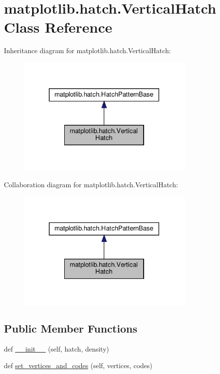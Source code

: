 \hypertarget{classmatplotlib_1_1hatch_1_1VerticalHatch}{}\section{matplotlib.\+hatch.\+Vertical\+Hatch Class Reference}
\label{classmatplotlib_1_1hatch_1_1VerticalHatch}


Inheritance diagram for matplotlib.\+hatch.\+Vertical\+Hatch\+:
\nopagebreak
\begin{figure}[H]
\begin{center}
\leavevmode
\includegraphics[width=249pt]{classmatplotlib_1_1hatch_1_1VerticalHatch__inherit__graph}
\end{center}
\end{figure}


Collaboration diagram for matplotlib.\+hatch.\+Vertical\+Hatch\+:
\nopagebreak
\begin{figure}[H]
\begin{center}
\leavevmode
\includegraphics[width=249pt]{classmatplotlib_1_1hatch_1_1VerticalHatch__coll__graph}
\end{center}
\end{figure}
\subsection*{Public Member Functions}
\begin{DoxyCompactItemize}
\item 
def \hyperlink{classmatplotlib_1_1hatch_1_1VerticalHatch_a54d00bb4b7506f10b47136e2cf0cfdd8}{\+\_\+\+\_\+init\+\_\+\+\_\+} (self, hatch, density)
\item 
def \hyperlink{classmatplotlib_1_1hatch_1_1VerticalHatch_a10bd4f9bc58517bc8189559c28628ca8}{set\+\_\+vertices\+\_\+and\+\_\+codes} (self, vertices, codes)
\end{DoxyCompactItemize}
